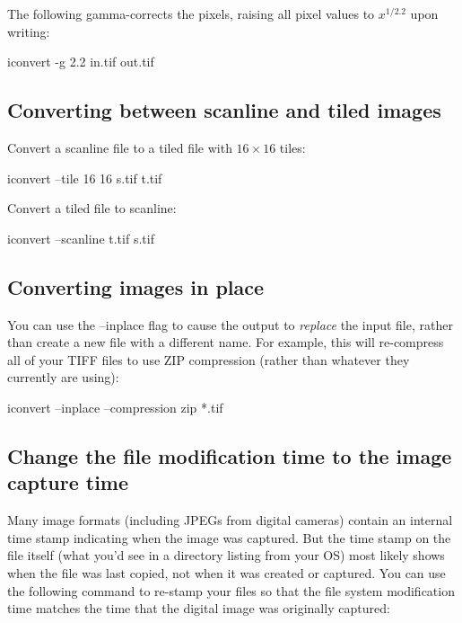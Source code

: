 The following gamma-corrects the pixels, raising all pixel
values to $x^{1/2.2}$ upon writing:

\begin{code}
    iconvert -g 2.2 in.tif out.tif
\end{code}

\subsection*{Converting between scanline and tiled images}

Convert a scanline file to a tiled file with $16 \times 16$ tiles:

\begin{code}
    iconvert --tile 16 16 s.tif t.tif
\end{code}

\noindent Convert a tiled file to scanline:

\begin{code}
    iconvert --scanline t.tif s.tif
\end{code}


\subsection*{Converting images in place}

You can use the {\cf --inplace} flag to cause the output to
\emph{replace} the input file, rather than create a new file with a
different name.  For example, this will re-compress all of your 
TIFF files to use ZIP compression (rather than whatever they currently
are using):

\begin{code}
    iconvert --inplace --compression zip *.tif
\end{code}

\subsection*{Change the file modification time to the image capture time}

Many image formats (including JPEGs from digital cameras) contain an
internal time stamp indicating when the image was captured.  But the
time stamp on the file itself (what you'd see in a directory listing
from your OS) most likely shows when the file was last copied, not when
it was created or captured.  You can use the following command to
re-stamp your files so that the file system modification time matches
the time that the digital image was originally captured:

